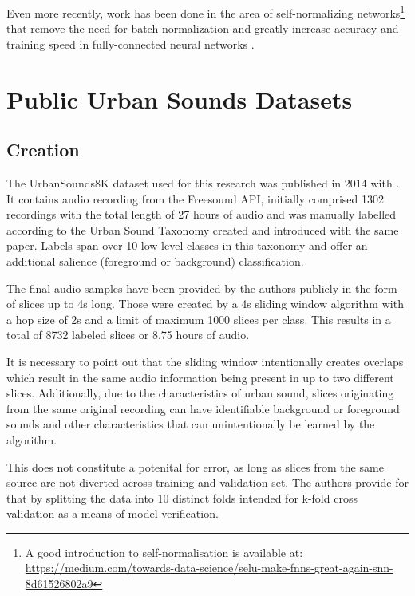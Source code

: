 Even more recently, work has been done in the area of self-normalizing networks\footnote{A good introduction to self-normalisation is available at: \url{https://medium.com/towards-data-science/selu-make-fnns-great-again-snn-8d61526802a9}} that remove the need for batch normalization and greatly increase accuracy and training speed in fully-connected neural networks \cite{DBLP:journals/corr/KlambauerUMH17}.



\chapter{Public Urban Sounds Datasets}

\section{Creation}

The UrbanSounds8K dataset used for this research was published in 2014 with \cite{Salamon:UrbanSound:ACMMM:14}. It contains audio recording from the Freesound API, initially comprised 1302 recordings with the total length of 27 hours of audio and was manually labelled according to the Urban Sound Taxonomy created and introduced with the same paper. Labels span over 10 low-level classes in this taxonomy and offer an additional salience (foreground or background) classification.

The final audio samples have been provided by the authors publicly in the form of slices up to 4s long. Those were created by a 4s sliding window algorithm with a hop size of 2s and a limit of maximum 1000 slices per class. This results in a total of 8732 labeled slices or 8.75 hours of audio.

It is necessary to point out that the sliding window intentionally creates overlaps which result in the same audio information being present in up to two different slices. Additionally, due to the characteristics of urban sound, slices originating from the same original recording can have identifiable background or foreground sounds and other characteristics that can unintentionally be learned by the algorithm. %

 This does not constitute a potenital for error, as long as 
  slices from the same source are not diverted across training and validation set. The authors provide for that by splitting the data into 10 distinct folds intended for k-fold cross validation as a means of model verification.


